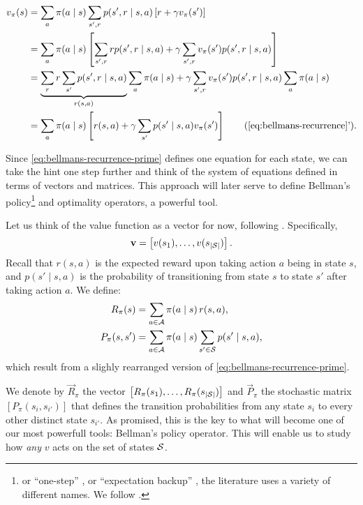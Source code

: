 \begin{align}
\label{eq:bellmans-recurrence-prime}
v_\pi(s) &= \sum_{a} \pi(a \mid s) \sum_{s', r} p(s', r \mid s, a) \left[ r + \gamma v_\pi (s') \right] \nonumber \\
&= \sum_{a} \pi(a \mid s) \left[ \sum_{s', r} r p(s', r \mid s, a) + \gamma \sum_{s', r} v_\pi (s') p(s', r \mid s,a) \right] \nonumber \\
&= \underbrace{\sum_{r} r \sum_{s'} p(s', r \mid s, a)}_{r(s,a)} \sum_a \pi(a \mid s) + \gamma \sum_{s', r} v_\pi (s') p(s', r \mid s, a) \sum_{a} \pi(a \mid s) \nonumber \\
&= \sum_{a} \pi(a \mid s) \left[ r(s,a) + \gamma \sum_{s'} p(s' \mid s, a) v_\pi (s') \right] \tag{\ref{eq:bellmans-recurrence}'}.
\end{align}

Since \eqref{eq:bellmans-recurrence-prime} defines one equation for each state,
we can take the hint one step further and think of the system of equations
defined in terms of vectors and matrices. This approach will later serve to
define Bellman's policy\footnote{or ``one-step'' \cite[pg.~9]{nadeemward2021},
or ``expectation backup'' \cite[Lect.~3, Contraction Mapping]{silver2015}, the
literature uses a variety of different names. We follow
\cite{rao2022}.} and optimality operators, a powerful tool.

Let us think of the value function as a vector for now, following \cite[pg.~132]{raoRL4F}. Specifically,
\begin{equation*}
    \mathbf{v} = \left[ v (s_1), \dots , v (s_{|\mathcal{S}|}) \right].
\end{equation*}
Recall that $r(s, a)$ is the expected reward upon taking action $a$ being in
state $s$, and $p(s' \mid s, a)$ is the probability of transitioning from state
$s$ to state $s'$ after taking action $a$. We define:
\begin{align*}
    R_\pi (s) &= \sum_{a \in \mathcal{A}} \pi(a \mid s) \, r(s,a), \\
    P_\pi (s, s') &= \sum_{a \in \mathcal{A}} \pi(a \mid s) \sum_{s' \in \mathcal{S}} p(s' \mid s, a),
\end{align*}
which result from a slighly rearranged version of \eqref{eq:bellmans-recurrence-prime}.

We denote by $\vec{R}_\pi$ the vector $\left[ R_\pi(s_1), \dots, R_\pi
(s_{|\mathcal{S}|}) \right]$ and $\vec{P}_\pi$ the stochastic matrix $\left[
P_\pi(s_i, s_{i'}) \right]$ that defines the transition probabilities from any
state $s_i$ to every other distinct state $s_{i'}$. As promised, this is the key
to what will become one of our most powerfull tools: Bellman's policy operator.
This will enable us to study how \textit{any} $v$ acts on the set of states
$\mathcal{S}$.

